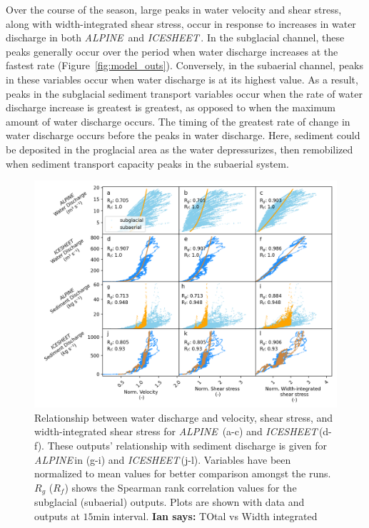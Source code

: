 \documentclass[11pt]{article}
\newcommand{\ian}[1]{{\textbf{\color{blue}Ian says:} \color{blue} #1} }
\newcommand{\alpine}{\textit{ALPINE}\,}
\newcommand{\icesheet}{\textit{ICESHEET}\,}
\newcommand{\unit}[1]{$\mathrm{#1}$}
\begin{document}
Over the course of the season, large peaks in water velocity and shear stress, along with width-integrated shear stress, occur in response to increases in water discharge in both \alpine{} and \icesheet{}.
In the subglacial channel, these peaks generally occur over the period when water discharge increases at the fastest rate (Figure~\ref{fig:model_outs}).
Conversely, in the subaerial channel, peaks in these variables occur when water discharge is at its highest value.
As a result, peaks in the subglacial sediment transport variables occur  when the rate of water discharge increase is greatest
is greatest, as opposed to when the maximum amount of water discharge occurs.
The timing of the greatest rate of change in water discharge occurs before the peaks in water discharge. 
Here, sediment could be deposited in the proglacial area as the water depressurizes, then remobilized when sediment transport capacity peaks in the subaerial system.

\begin{figure}[h]
  \centering
  \includegraphics[width=0.9\linewidth]{Fig3.png}
  \caption{Relationship between water discharge and velocity, shear stress, and width-integrated shear stress for \alpine{} (a-c) and \icesheet (d-f).
    These outputs' relationship with sediment discharge is given for \alpine in (g-i) and \icesheet (j-l).
    Variables have been normalized to mean values for better comparison amongst the runs.
    $R_g$ ($R_f$) shows the Spearman rank correlation values for the subglacial (subaerial) outputs.
    Plots are shown with data and outputs at $15$\unit{min} interval.
    \ian{TOtal vs Width integrated}
  } 
  \label{fig:Qw_vari}
\end{figure}
\end{document}
